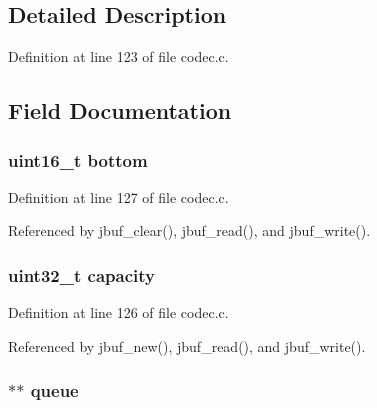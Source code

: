\subsection{Detailed Description}


Definition at line 123 of file codec.\+c.



\subsection{Field Documentation}
\hypertarget{struct___jitter_buffer_a12c8099ac87952580dd090215e02728c}{
\subsubsection[{bottom}]{\setlength{\rightskip}{0pt plus 5cm}uint16\+\_\+t bottom}}\label{struct___jitter_buffer_a12c8099ac87952580dd090215e02728c}


Definition at line 127 of file codec.\+c.



Referenced by jbuf\+\_\+clear(), jbuf\+\_\+read(), and jbuf\+\_\+write().

\hypertarget{struct___jitter_buffer_a391c992c66c3e5540265a85ec2b9216a}{
\subsubsection[{capacity}]{\setlength{\rightskip}{0pt plus 5cm}uint32\+\_\+t capacity}}\label{struct___jitter_buffer_a391c992c66c3e5540265a85ec2b9216a}


Definition at line 126 of file codec.\+c.



Referenced by jbuf\+\_\+new(), jbuf\+\_\+read(), and jbuf\+\_\+write().

\hypertarget{struct___jitter_buffer_aba0e7057fa735d7bfaa585fd7bf43a24}{
\subsubsection[{queue}]{$\ast$$\ast$ queue}}\label{struct___jitter_buffer_aba0e7057fa735d7bfaa585fd7bf43a24}


